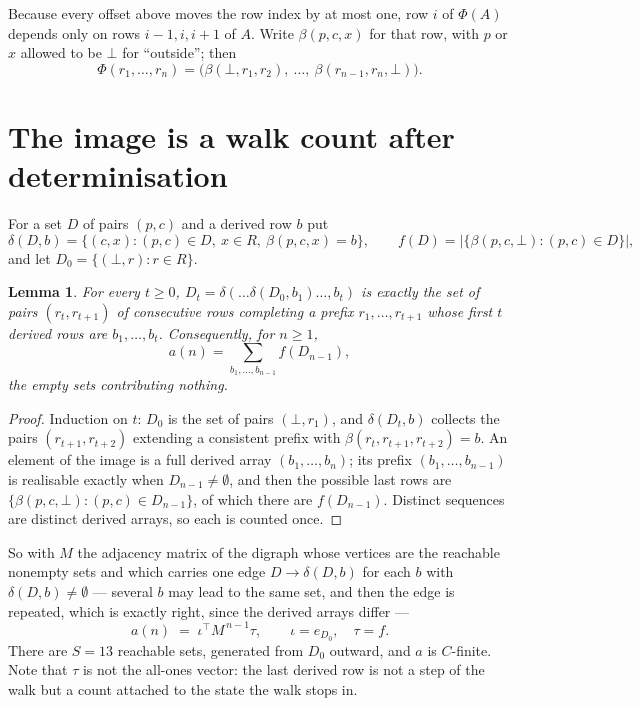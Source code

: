 \documentclass[11pt,a4paper]{article}
\theoremstyle{plain}
\newtheorem{lemma}[theorem]{Lemma}
\theoremstyle{definition}
\begin{document}
Because every offset above moves the row index by at most one, row $i$ of
$\Phi(A)$ depends only on rows $i-1,i,i+1$ of $A$. Write $\beta(p,c,x)$ for that row, with $p$
or $x$ allowed to be $\bot$ for ``outside''; then
\[
\Phi(r_1,\dots,r_n)=\bigl(\beta(\bot,r_1,r_2),\ \dots,\ \beta(r_{n-1},r_n,\bot)\bigr).
\]

\section{The image is a walk count after determinisation}

For a set $D$ of pairs $(p,c)$ and a derived row $b$ put
\[
\delta(D,b)=\{(c,x):(p,c)\in D,\ x\in R,\ \beta(p,c,x)=b\},\qquad
f(D)=\bigl|\{\beta(p,c,\bot):(p,c)\in D\}\bigr| ,
\]
and let $D_0=\{(\bot,r):r\in R\}$.

\begin{lemma}\label{lem:det}
For every $t\ge0$, $D_t=\delta(\dots\delta(D_0,b_1)\dots,b_t)$ is exactly the set of pairs
$(r_t,r_{t+1})$ of consecutive rows completing a prefix $r_1,\dots,r_{t+1}$ whose first $t$
derived rows are $b_1,\dots,b_t$. Consequently, for $n\ge1$,
\[
a(n)=\sum_{b_1,\dots,b_{n-1}}f(D_{n-1}),
\]
the empty sets contributing nothing.
\end{lemma}

\begin{proof}
Induction on $t$: $D_0$ is the set of pairs $(\bot,r_1)$, and $\delta(D_t,b)$ collects the
pairs $(r_{t+1},r_{t+2})$ extending a consistent prefix with
$\beta(r_t,r_{t+1},r_{t+2})=b$. An element of the image is a full derived array
$(b_1,\dots,b_n)$; its prefix $(b_1,\dots,b_{n-1})$ is realisable exactly when
$D_{n-1}\neq\emptyset$, and then the possible last rows are
$\{\beta(p,c,\bot):(p,c)\in D_{n-1}\}$, of which there are $f(D_{n-1})$. Distinct sequences
are distinct derived arrays, so each is counted once.
\end{proof}

So with $M$ the adjacency matrix of the digraph whose vertices are the reachable nonempty sets
and which carries one edge $D\to\delta(D,b)$ for each $b$ with $\delta(D,b)\neq\emptyset$ ---
several $b$ may lead to the same set, and then the edge is repeated, which is exactly right,
since the derived arrays differ ---
\[
a(n)\;=\;\iota^{\!\top}M^{\,n-1}\tau,\qquad \iota=e_{D_0},\quad \tau=f .
\]
There are $S=13$ reachable sets, generated from $D_0$ outward, and $a$ is $C$-finite.
Note that $\tau$ is not the all-ones vector: the last derived row is not a
step of the walk but a count attached to the state the walk stops in.
\end{document}

